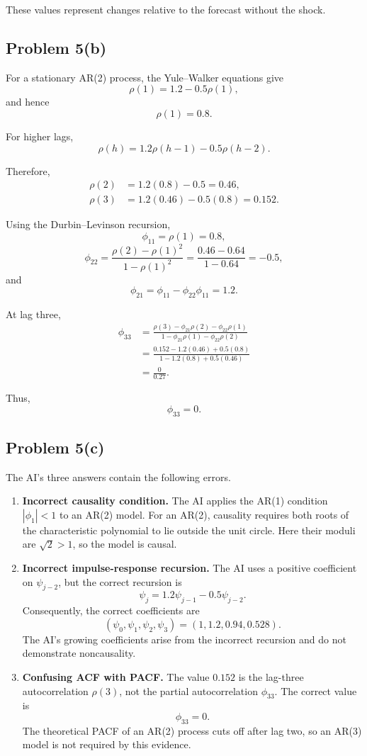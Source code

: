 \documentclass[11pt]{article}
\begin{document}
These values represent changes relative
to the forecast without the shock.

\subsection*{Problem 5(b)}

For a stationary AR(2) process, the
Yule--Walker equations give
\[
\rho(1)=1.2-0.5\rho(1),
\]
and hence
\[
\rho(1)=0.8.
\]

For higher lags,
\[
\rho(h)=1.2\rho(h-1)-0.5\rho(h-2).
\]

Therefore,
\[
\begin{aligned}
\rho(2)&=1.2(0.8)-0.5=0.46,\\
\rho(3)&=1.2(0.46)-0.5(0.8)=0.152.
\end{aligned}
\]

Using the Durbin--Levinson recursion,
\[
\phi_{11}=\rho(1)=0.8,
\]
\[
\phi_{22}
=\frac{\rho(2)-\rho(1)^2}
{1-\rho(1)^2}
=\frac{0.46-0.64}{1-0.64}
=-0.5,
\]
and
\[
\phi_{21}
=\phi_{11}-\phi_{22}\phi_{11}
=1.2.
\]

At lag three,
\[
\begin{aligned}
\phi_{33}
&=\frac{\rho(3)-\phi_{21}\rho(2)
-\phi_{22}\rho(1)}
{1-\phi_{21}\rho(1)-\phi_{22}\rho(2)}\\
&=\frac{0.152-1.2(0.46)+0.5(0.8)}
{1-1.2(0.8)+0.5(0.46)}\\
&=\frac{0}{0.27}.
\end{aligned}
\]

Thus,
\[
\boxed{\phi_{33}=0}.
\]

\subsection*{Problem 5(c)}

The AI's three answers contain the
following errors.

\begin{enumerate}
\item \textbf{Incorrect causality condition.}
The AI applies the AR(1) condition
\(|\phi_1|<1\) to an AR(2) model.
For an AR(2), causality requires both
roots of the characteristic polynomial
to lie outside the unit circle.
Here their moduli are \(\sqrt{2}>1\),
so the model is causal.

\item \textbf{Incorrect impulse-response
recursion.}
The AI uses a positive coefficient on
\(\psi_{j-2}\), but the correct recursion is
\[
\psi_j=1.2\psi_{j-1}-0.5\psi_{j-2}.
\]
Consequently, the correct coefficients are
\[
(\psi_0,\psi_1,\psi_2,\psi_3)
=(1,1.2,0.94,0.528).
\]
The AI's growing coefficients arise from
the incorrect recursion and do not
demonstrate noncausality.

\item \textbf{Confusing ACF with PACF.}
The value \(0.152\) is the lag-three
autocorrelation \(\rho(3)\), not the
partial autocorrelation \(\phi_{33}\).
The correct value is
\[
\boxed{\phi_{33}=0}.
\]
The theoretical PACF of an AR(2) process
cuts off after lag two, so an AR(3)
model is not required by this evidence.
\end{enumerate}
\end{document}
